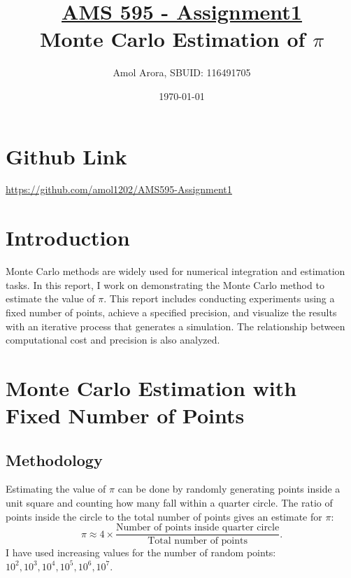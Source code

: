 \documentclass{article}
\title{\underline{AMS 595 - Assignment1} \\ Monte Carlo Estimation of $\pi$}
\author{Amol Arora, SBUID: 116491705}
\date{\today}
\begin{document}
\maketitle

\tableofcontents

\section{Github Link}
\href{https://github.com/amol1202/AMS595-Assignment1}{\underline{https://github.com/amol1202/AMS595-Assignment1}}

\section{Introduction}

Monte Carlo methods are widely used for numerical integration and estimation tasks. In this report, I work on demonstrating the Monte Carlo method to estimate the value of $\pi$. This report includes conducting experiments using a fixed number of points, achieve a specified precision, and visualize the results with an iterative process that generates a simulation. The relationship between computational cost and precision is also analyzed.


\section{Monte Carlo Estimation with Fixed Number of Points}
\subsection{Methodology}
Estimating the value of $\pi$ can be done by randomly generating points inside a unit square and counting how many fall within a quarter circle. The ratio of points inside the circle to the total number of points gives an estimate for $\pi$:
\[
	\pi \approx 4 \times \frac{\text{Number of points inside quarter circle}}{\text{Total number of points}}.
\]
I have used increasing values for the number of random points: $10^2, 10^3, 10^4, 10^5, 10^6, 10^7$.
\end{document}
